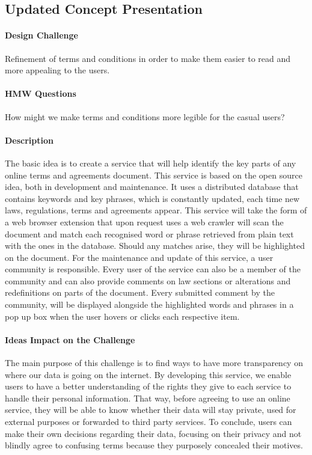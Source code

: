\subsection{Updated Concept Presentation}

\paragraph{Design Challenge} 

Refinement of terms and conditions in order to make them easier to read and more 
appealing to the users.

\paragraph{HMW Questions}

How might we make terms and conditions more legible for the casual users?

\paragraph{Description}

The basic idea is to create a service that will help identify the key parts of 
any online terms and agreements document. This service is based on the open 
source idea, both in development and maintenance. It uses a distributed database 
that contains keywords and key phrases, which is constantly updated, each time 
new laws, regulations, terms and agreements appear. This service will take the 
form of a web browser extension that upon request uses a web crawler will scan 
the document and match each recognised word or phrase retrieved from plain text 
with the ones in the database. Should any matches arise, they will be 
highlighted on the document. For the maintenance and update of this service, a 
user community is responsible. Every user of the service can also be a member of 
the community and can also provide comments on law sections or alterations and 
redefinitions on parts of the document. Every submitted comment by the community, 
will be displayed alongside the highlighted words and phrases in a pop up box 
when the user hovers or clicks each respective item.

\paragraph{Ideas Impact on the Challenge}

The main purpose of this challenge is to find ways to have more transparency on 
where our data is going on the internet. By developing this service, we enable 
users to have a better understanding of the rights they give to each service to 
handle their personal information. That way, before agreeing to use an online 
service, they will be able to know whether their data will stay private, used 
for external purposes or forwarded to third party services. To conclude, users 
can make their own decisions regarding their data, focusing on their privacy and 
not blindly agree to confusing terms because they purposely concealed their 
motives.


